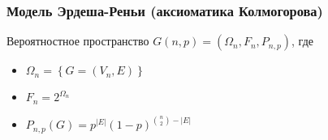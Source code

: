 \frametitle{Модель Эрдеша-Реньи (аксиоматика Колмогорова)} 


\begin{rdefinition}   
    Вероятностное пространство $G(n, p) = \left(\Omega_n, F_n, P_{n, p}\right)$, где \\
    \begin{itemize}
        \item $\Omega_n = \left\{G = \left(V_n, E\right)\right\}$
        \item $F_n = 2^{\Omega_n}$
        \item $P_{n, p}\left(G\right) = p^{|E|}(1-p)^{\binom{n}{2} - |E|}$
    \end{itemize}
\end{rdefinition}
